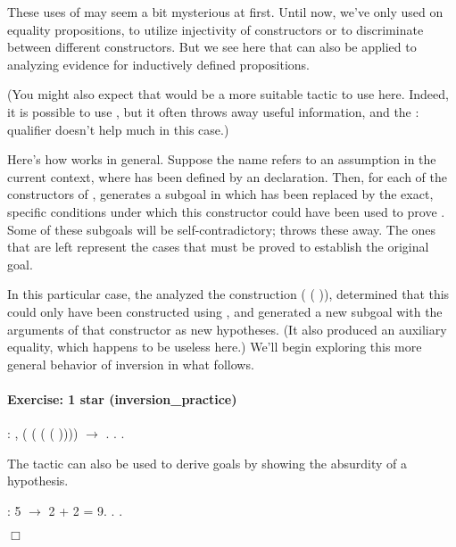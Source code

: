 \documentclass[12pt]{report}
\begin{document}
 These uses of  may seem a bit mysterious at first.
    Until now, we've only used  on equality
    propositions, to utilize injectivity of constructors or to
    discriminate between different constructors.  But we see here
    that  can also be applied to analyzing evidence
    for inductively defined propositions.


    (You might also expect that  would be a more suitable
    tactic to use here. Indeed, it is possible to use , but 
    it often throws away useful information, and the : qualifier
    doesn't help much in this case.)    


    Here's how  works in general.  Suppose the name
     refers to an assumption  in the current context, where
     has been defined by an  declaration.  Then,
    for each of the constructors of ,   generates
    a subgoal in which  has been replaced by the exact,
    specific conditions under which this constructor could have
    been used to prove .  Some of these subgoals will be
    self-contradictory;  throws these away.  The ones
    that are left represent the cases that must be proved to
    establish the original goal.


    In this particular case, the  analyzed the construction
     ( ( )), determined that this could only have been
    constructed using , and generated a new subgoal with the
    arguments of that constructor as new hypotheses.  (It also
    produced an auxiliary equality, which happens to be useless here.)
    We'll begin exploring this more general behavior of inversion in
    what follows. 

\paragraph{Exercise: 1 star (inversion\_practice)}

\begin{coqdoccode}
\coqdocnoindent
{}  : \coqdockw{\ensuremath{\forall}} ,\coqdoceol
\coqdocindent{1.00em}
 ( ( ( ( )))) \ensuremath{\rightarrow}  .\coqdoceol
\coqdocnoindent
{}.\coqdoceol
 .\coqdoceol
\coqdocemptyline
\end{coqdoccode}
The  tactic can also be used to derive goals by showing
    the absurdity of a hypothesis. \begin{coqdoccode}
\coqdocemptyline
\coqdocnoindent
{}  : \coqdoceol
\coqdocindent{1.00em}
 5 \ensuremath{\rightarrow} 2 + 2 = 9.\coqdoceol
\coqdocnoindent
{}.\coqdoceol
 .\coqdoceol
\end{coqdoccode}
\ensuremath{\Box} 
\end{document}

